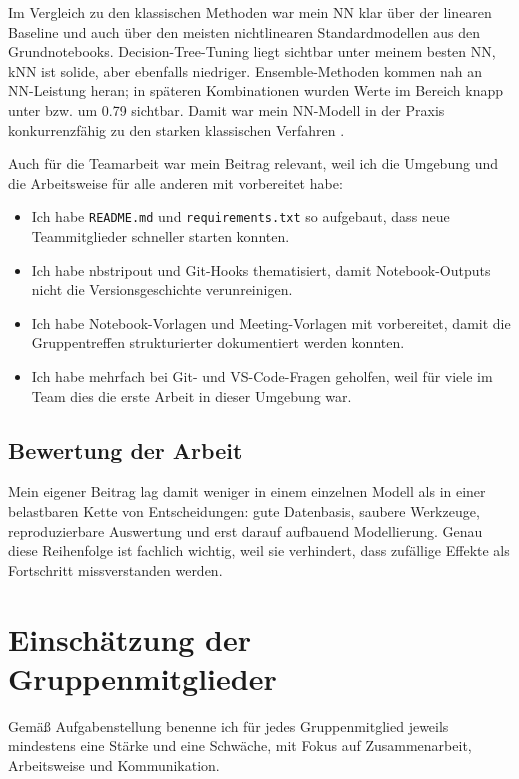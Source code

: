 \documentclass[9pt,a4paper,twocolumn,twoside]{tau-class/tau}
\begin{document}
Im Vergleich zu den klassischen Methoden war mein NN klar \"uber der linearen Baseline und auch \"uber den meisten nichtlinearen Standardmodellen aus den Grundnotebooks. Decision-Tree-Tuning liegt sichtbar unter meinem besten NN, kNN ist solide, aber ebenfalls niedriger. Ensemble-Methoden kommen nah an NN-Leistung heran; in sp\"ateren Kombinationen wurden Werte im Bereich knapp unter bzw. um 0.79 sichtbar. Damit war mein NN-Modell in der Praxis konkurrenzf\"ahig zu den starken klassischen Verfahren \cite{bergstra2012,srivastava2014}.

Auch f\"ur die Teamarbeit war mein Beitrag relevant, weil ich die Umgebung und die Arbeitsweise f\"ur alle anderen mit vorbereitet habe:

\begin{itemize}[leftmargin=*,itemsep=0.15em,topsep=0.15em]
    \item Ich habe \texttt{README.md} und \texttt{requirements.txt} so aufgebaut, dass neue Teammitglieder schneller starten konnten.
    \item Ich habe nbstripout und Git-Hooks thematisiert, damit Notebook-Outputs nicht die Versionsgeschichte verunreinigen.
    \item Ich habe Notebook-Vorlagen und Meeting-Vorlagen mit vorbereitet, damit die Gruppentreffen strukturierter dokumentiert werden konnten.
    \item Ich habe mehrfach bei Git- und VS-Code-Fragen geholfen, weil f\"ur viele im Team dies die erste Arbeit in dieser Umgebung war.
\end{itemize}

\subsection*{Bewertung der Arbeit}
Mein eigener Beitrag lag damit weniger in einem einzelnen Modell als in einer belastbaren Kette von Entscheidungen: gute Datenbasis, saubere Werkzeuge, reproduzierbare Auswertung und erst darauf aufbauend Modellierung. Genau diese Reihenfolge ist fachlich wichtig, weil sie verhindert, dass zuf\"allige Effekte als Fortschritt missverstanden werden.

\section{Einsch\"atzung der Gruppenmitglieder}
Gem\"a\ss{} Aufgabenstellung benenne ich f\"ur jedes Gruppenmitglied jeweils mindestens eine St\"arke und eine Schw\"ache, mit Fokus auf Zusammenarbeit, Arbeitsweise und Kommunikation.
\end{document}

